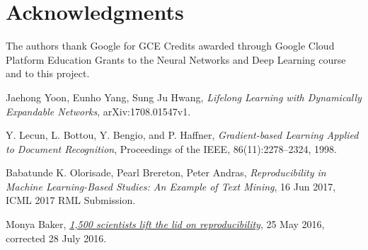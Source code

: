 \documentclass[12pt]{article}
\begin{document}
    \section{Acknowledgments}

    The authors thank Google for GCE Credits awarded through Google Cloud Platform Education Grants
    to the Neural Networks and Deep Learning course and to this project.    
        
    \begin{thebibliography}{9}
            Jaehong Yoon, Eunho Yang, Sung Ju Hwang,
            \textit{Lifelong Learning with Dynamically Expandable Networks},
            arXiv:1708.01547v1.

            Y. Lecun, L. Bottou, Y. Bengio, and P. Haffner,
            \textit{Gradient-based Learning Applied to Document Recognition},
            Proceedings of the IEEE, 86(11):2278–2324, 1998.

            Babatunde K. Olorisade, Pearl Brereton, Peter Andras, 
            \textit{Reproducibility in Machine Learning-Based Studies: An Example of Text Mining},
            16 Jun 2017, ICML 2017 RML Submission.

            Monya Baker,
            \href{https://www.nature.com/news/1-500-scientists-lift-the-lid-on-reproducibility-1.19970}{\textit{1,500 scientists lift the lid on reproducibility}},
            25 May 2016, corrected 28 July 2016.

    \end{thebibliography}
    
    
\end{document}
